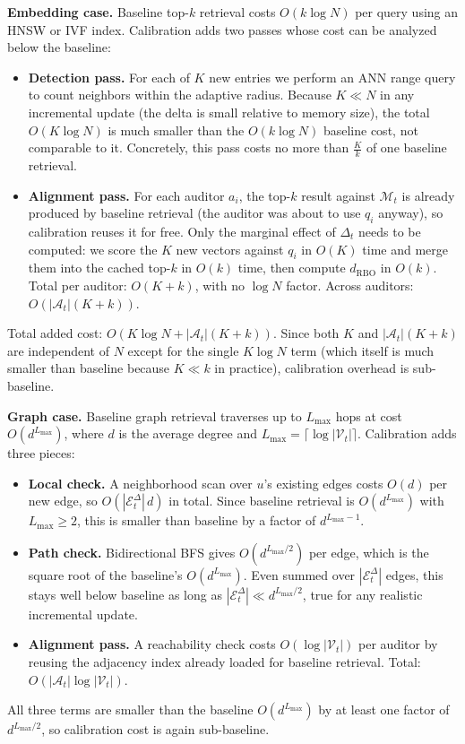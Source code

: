 \textbf{Embedding case.}
Baseline top-$k$ retrieval costs $O(k \log N)$ per query using an
HNSW or IVF index. Calibration adds two passes whose cost can be
analyzed below the baseline:
\begin{itemize}
    \item \textbf{Detection pass.} For each of $K$ new entries we
    perform an ANN range query to count neighbors within the
    adaptive radius. Because $K \ll N$ in any incremental update
    (the delta is small relative to memory size), the total
    $O(K \log N)$ is much smaller than the $O(k \log N)$ baseline cost,
    not comparable to it. Concretely, this pass costs no more than
    $\frac{K}{k}$ of one baseline retrieval.
    \item \textbf{Alignment pass.} For each auditor $a_i$, the
    top-$k$ result against $\mathcal{M}_t$ is already produced by
    baseline retrieval (the auditor was about to use $q_i$ anyway),
    so calibration reuses it for free. Only the marginal effect of
    $\Delta_t$ needs to be computed: we score the $K$ new vectors
    against $q_i$ in $O(K)$ time and merge them into the cached
    top-$k$ in $O(k)$ time, then compute $d_{\text{RBO}}$ in $O(k)$.
    Total per auditor: $O(K + k)$, with no $\log N$ factor. Across
    auditors: $O(|\mathcal{A}_t|(K + k))$.
\end{itemize}
Total added cost: $O(K \log N + |\mathcal{A}_t|(K + k))$. Since both
$K$ and $|\mathcal{A}_t|(K + k)$ are independent of $N$ except for the
single $K \log N$ term (which itself is much smaller than baseline
because $K \ll k$ in practice), calibration overhead is sub-baseline.

\textbf{Graph case.}
Baseline graph retrieval traverses up to $L_{\max}$ hops at cost
$O(d^{L_{\max}})$, where $d$ is the average degree and $L_{\max} =
\lceil \log |\mathcal{V}_t| \rceil$. Calibration adds three pieces:
\begin{itemize}
    \item \textbf{Local check.} A neighborhood scan over $u$'s
    existing edges costs $O(d)$ per new edge, so $O(|\mathcal{E}_t^\Delta| \, d)$
    in total. Since baseline retrieval is $O(d^{L_{\max}})$ with
    $L_{\max} \geq 2$, this is smaller than baseline by a factor of
    $d^{L_{\max} - 1}$.
    \item \textbf{Path check.} Bidirectional BFS gives
    $O(d^{L_{\max}/2})$ per edge, which is the square root of the
    baseline's $O(d^{L_{\max}})$. Even summed over
    $|\mathcal{E}_t^\Delta|$ edges, this stays well below baseline as
    long as $|\mathcal{E}_t^\Delta| \ll d^{L_{\max}/2}$, true for any
    realistic incremental update.
    \item \textbf{Alignment pass.} A reachability check costs
    $O(\log |\mathcal{V}_t|)$ per auditor by reusing the adjacency
    index already loaded for baseline retrieval. Total:
    $O(|\mathcal{A}_t| \log |\mathcal{V}_t|)$.
\end{itemize}
All three terms are smaller than the baseline $O(d^{L_{\max}})$ by at
least one factor of $d^{L_{\max}/2}$, so calibration cost is again
sub-baseline.

